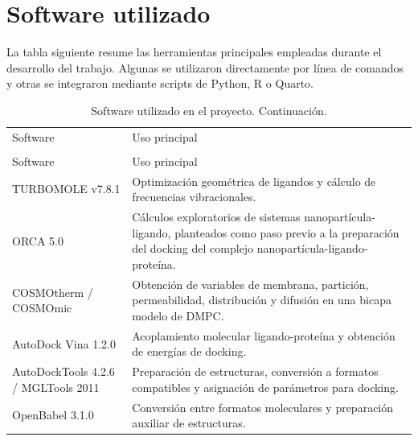 \documentclass[
  spanish,
  a4paper,
  12pt,
  oneside,
  openany]{memoir}
\begin{document}
\section{Software utilizado}

La tabla siguiente resume las herramientas principales empleadas durante
el desarrollo del trabajo. Algunas se utilizaron directamente por línea
de comandos y otras se integraron mediante scripts de Python, R o
Quarto.

\begingroup
\scriptsize
\setlength{\tabcolsep}{4pt}
\renewcommand{\arraystretch}{1.05}

\begin{longtable}{>{\raggedright\arraybackslash}p{}>{\raggedright\arraybackslash}p{}}

\caption{\label{tbl-anexo-software}Software utilizado en el proyecto.}

\tabularnewline

\\
\toprule
Software & Uso principal \\
\midrule
\endfirsthead

\caption[]{Software utilizado en el proyecto. Continuación.}\\
\toprule
Software & Uso principal \\
\midrule
\endhead

\bottomrule
\endlastfoot

TURBOMOLE v7.8.1 & Optimización geométrica de ligandos y cálculo de frecuencias vibracionales. \\

ORCA 5.0 & Cálculos exploratorios de sistemas nanopartícula-ligando, planteados como paso previo a la preparación del docking del complejo nanopartícula-ligando-proteína. \\

COSMOtherm / COSMOmic & Obtención de variables de membrana, partición, permeabilidad, distribución y difusión en una bicapa modelo de DMPC. \\

AutoDock Vina 1.2.0 & Acoplamiento molecular ligando-proteína y obtención de energías de docking. \\

AutoDockTools 4.2.6 / MGLTools 2011 & Preparación de estructuras, conversión a formatos compatibles y asignación de parámetros para docking. \\

OpenBabel 3.1.0 & Conversión entre formatos moleculares y preparación auxiliar de estructuras. \\


\end{longtable}
\end{document}
